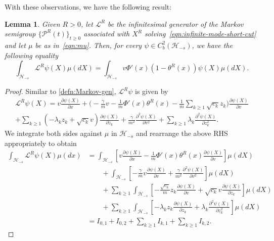 \documentclass[11pt]{amsart}
\theoremstyle{definition}
\renewcommand{\L}{\mathcal{L}}
\renewcommand{\H}{\mathcal{H}}
\newcommand{\PMarkov}{\mathcal{P}}
\theoremstyle{definition}
\theoremstyle{plain}
\newtheorem{lemma}[theorem]{Lemma}
\numberwithin{equation}{section}
\begin{document}
With these observations, we have the following result:
\begin{lemma} \label{lem:gen-cut} Given $R>0$, let $\L^R$ be the infinitesimal generator of the Markov semigroup $\{\PMarkov^R(t)\}_{t\geq 0}$ associated with $X^R$ solving~\eqref{eqn:infinite-mode-short-cut} and let $\mu$ be as in~\eqref{eqn:mu}. Then, for every $\psi\in C^2_b(\H_{-s})$, we have the following equality 
\begin{equation} \label{eqn:gen-cut-1}
\int_{\mathcal{H}_{-s}}\!\!\!\! \L^R\psi(X)\mu(dX) = \int_{\mathcal{H}_{-s}}\!\! \!\!v\Phi'(x)\left(1-\theta^R(x)\right)\psi(X)\mu(dX).
\end{equation}
\end{lemma}
\begin{proof} Similar to \eqref{defn:Markov-gen}, $\L^R\psi$ is given by
\begin{multline} \label{eqn:density-7}
\L^R\psi(X) = v\frac{\partial\psi(X)}{\partial x}+\Big(\!\!-\frac{\gamma}{m}v-\frac{1}{m}\Phi'(x)\theta^R(x)-\frac{1}{m}\sum_{k\geq 1}\sqrt{c_k}z_k\Big)\frac{\partial\psi(X)}{\partial v}\\
+\sum_{k\geq 1} \left(-\lambda_kz_k+\sqrt{c_k}v\right)\frac{\partial\psi(X)}{\partial z_k}+ \frac{\gamma}{m^2}\frac{\partial ^2\psi(X)}{\partial v^2}+\sum_{k\geq 1}\lambda_k\frac{\partial ^2\psi(X)}{\partial z_k^2}.
\end{multline}
We integrate both sides against $\mu$ in $\H_{-s}$   and rearrange the above RHS appropriately to obtain
\begin{equation} \label{eqn:gen-cut-7a}
\begin{aligned}
\int_{\mathcal{H}_{-s}} \L^R\psi(X)\mu(dx)
&= \int_{\mathcal{H}_{-s}} \left[v\frac{\partial \psi(X)}{\partial x}-\frac{1}{m}\Phi'(x)\theta^R(x)\frac{\partial \psi(X)}{\partial v}\right]\mu(dX)\\
&\qquad+\int_{\mathcal{H}_{-s}} \left[-\frac{\gamma}{m}v\frac{\partial \psi(X)}{\partial v}+\frac{\gamma}{m^2}\frac{\partial ^2\psi(X)}{\partial v^2}\right]\mu(dX)\\
&\qquad+\sum_{k\geq 1}\int_{\mathcal{H}_{-s}} \left[-\frac{\sqrt{c_k}}{m}z_k\frac{\partial \psi(X)}{\partial v}+\sqrt{c_k}v\frac{\partial \psi(X)}{\partial z_k}\right]\mu(dX)\\
&\qquad+\sum_{k\geq 1}\int_{\mathcal{H}_{-s}} \left[-\lambda_kz_k\frac{\partial \psi(X)}{\partial z_k}+\lambda_k\frac{\partial ^2\psi(X)}{\partial z_k^2}\right]\mu(dX)\\
&=I_{0,1}+I_{0,2}+\sum_{k\geq 1}I_{k,1}+\sum_{k\geq 1}I_{k,2}.

\end{aligned}
\end{equation}
\end{proof}
\end{document}
